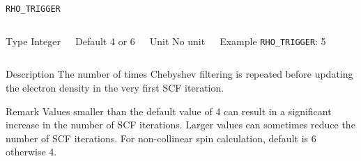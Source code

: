 \documentclass[xcolor=dvipsnames,t]{beamer}
\begin{document}
\begin{frame}[allowframebreaks]{\texttt{RHO\_TRIGGER}} \label{RHO_TRIGGER}
\vspace*{-12pt}
\begin{columns}
\begin{block}{Type}
Integer
\end{block}

\begin{block}{Default}
4 or 6
\end{block}

\begin{block}{Unit}
No unit
\end{block}

\begin{block}{Example}
\texttt{RHO\_TRIGGER}: 5
\end{block}
\end{columns}

\begin{block}{Description}
The number of times Chebyshev filtering is repeated before updating the electron density in the very first SCF iteration.
\end{block}

\begin{block}{Remark}
Values smaller than the default value of 4 can result in a significant increase in the number of SCF
iterations. Larger values can sometimes reduce the number of SCF iterations. For non-collinear spin calculation, default is 6 otherwise 4.
\end{block}

\end{frame}
\end{document}

